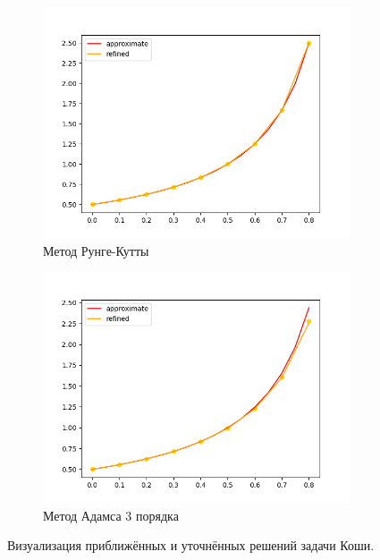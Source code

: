 \documentclass[12pt]{article}%
\begin{document}
\begin{figure}[!h]
\centering
\begin{subfigure}{0.49\textwidth}
    \includegraphics[width=\textwidth]{task2_rk.png}
    \caption{Метод Рунге-Кутты}
\end{subfigure}
\hfill
\begin{subfigure}{0.49\textwidth}
    \includegraphics[width=\textwidth]{task2_adams.png}
    \caption{Метод Адамса 3 порядка}
\end{subfigure}

\caption{Визуализация приближённых и уточнённых решений задачи Коши.}
\end{figure}
\end{document}

